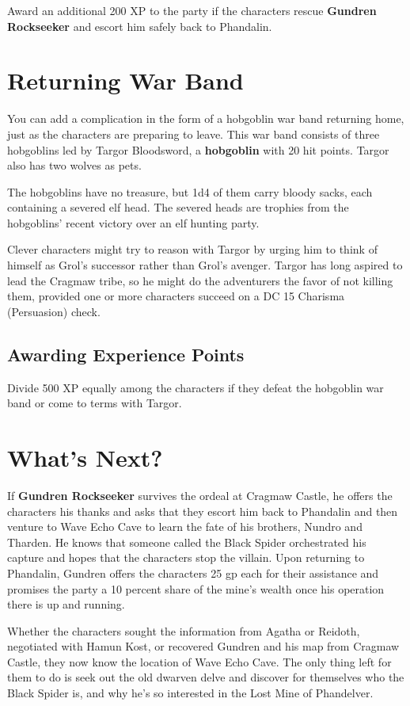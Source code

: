 \documentclass[10pt,a4paper,twoside,bg=print,twocolumn,openany,nodeprecatedcode]{dndbook}
\begin{document}
Award an additional 200 XP to the party if the characters rescue \textbf{Gundren Rockseeker} and escort him safely back to Phandalin.

\section{Returning War Band}
You can add a complication in the form of a hobgoblin war band returning home, just as the characters are preparing to leave. This war band consists of three hobgoblins led by Targor Bloodsword, a \textbf{hobgoblin} with 20 hit points. Targor also has two wolves as pets.

The hobgoblins have no treasure, but 1d4 of them carry bloody sacks, each containing a severed elf head. The severed heads are trophies from the hobgoblins' recent victory over an elf hunting party.

Clever characters might try to reason with Targor by urging him to think of himself as Grol's successor rather than Grol's avenger. Targor has long aspired to lead the Cragmaw tribe, so he might do the adventurers the favor of not killing them, provided one or more characters succeed on a DC 15 Charisma (Persuasion) check.

\subsection{Awarding Experience Points}
Divide 500 XP equally among the characters if they defeat the hobgoblin war band or come to terms with Targor.

\section{What's Next?}
If \textbf{Gundren Rockseeker} survives the ordeal at Cragmaw Castle, he offers the characters his thanks and asks that they escort him back to Phandalin and then venture to Wave Echo Cave to learn the fate of his brothers, Nundro and Tharden. He knows that someone called the Black Spider orchestrated his capture and hopes that the characters stop the villain. Upon returning to Phandalin, Gundren offers the characters 25 gp each for their assistance and promises the party a 10 percent share of the mine's wealth once his operation there is up and running.

Whether the characters sought the information from Agatha or Reidoth, negotiated with Hamun Kost, or recovered Gundren and his map from Cragmaw Castle, they now know the location of Wave Echo Cave. The only thing left for them to do is seek out the old dwarven delve and discover for themselves who the Black Spider is, and why he's so interested in the Lost Mine of Phandelver.
\end{document}
